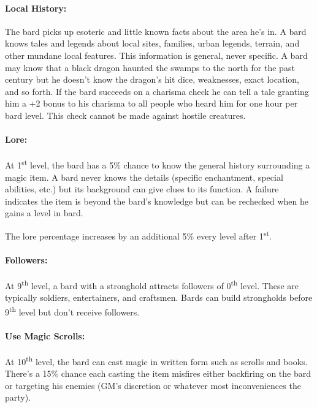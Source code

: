 \begin{multicols}{2}
\paragraph{Local History:}  The bard picks up esoteric and little known facts about the area he's in.  A bard knows tales and legends about local sites, families, urban legends, terrain, and other mundane local features.  This information is general, never specific.  A bard may know that a black dragon haunted the swamps to the north for the past century but he doesn't know the dragon's hit dice, weaknesses, exact location, and so forth.  If the bard succeeds on a charisma check he can tell a tale granting him a +2 bonus to his charisma to all people who heard him for one hour per bard level.  This check cannot be made against hostile creatures.

\paragraph{Lore:} At 1\textsuperscript{st} level, the bard has a 5\% chance to know the general history surrounding a magic item.  A bard never knows the details (specific enchantment, special abilities, etc.) but its background can give clues to its function.  A failure indicates the item is beyond the bard's knowledge but can be rechecked when he gains a level in bard.

The lore percentage increases by an additional 5\% every level after 1\textsuperscript{st}.  

\paragraph{Followers:} At 9\textsuperscript{th} level, a bard with a stronghold attracts followers of 0\textsuperscript{th} level.  These are typically soldiers, entertainers, and craftsmen.  Bards can build strongholds before 9\textsuperscript{th} level but don't receive followers.

\paragraph{Use Magic Scrolls:} At 10\textsuperscript{th} level, the bard can cast magic in written form such as scrolls and books.  There's a 15\% chance each casting the item misfires either backfiring on the bard or targeting his enemies (GM's discretion or whatever most inconveniences the party). 


\end{multicols}

